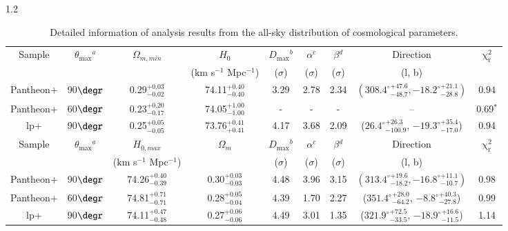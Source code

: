 \documentclass{aa}
\begin{document}
\begin{table}\footnotesize 
        \caption{ Detailed information of analysis results from the all-sky distribution of cosmological parameters. \label{T1}}
        \centering
        \begin{spacing}{1.2}
                \begin{tabular}{ccccccccc} 
                        \hline\hline
                        Sample & $\theta_\mathrm{max}$$^{a}$   & $\Omega_{m,min}$ & $H_{0}$ & $D_\mathrm{max}$$^{b}$ & $\alpha$$^{c}$ & $\beta$$^{d}$ & Direction & $\mathrm{\chi^{2}_{r}}$ \\
                        &   &  & (km s$^{-1}$ Mpc$^{-1}$) & ($\sigma$) & ($\sigma$) & ($\sigma$) & (l, b) & \\
                        \hline
                        Pantheon+ & 90$\degr$  & 0.29$^{+0.03}_{-0.02}$ & 74.11$^{+0.40}_{-0.40}$ &3.29 & 2.78 & 2.34 & $({308.4^{\circ}}_{-48.7}^{+47.6}, {-18.2^{\circ}}_{-28.8}^{+21.1})$ & 0.94 \\
                        Pantheon+ & 60$\degr$  & 0.23$^{+0.20}_{-0.17}$ & 74.05$^{+1.00}_{-1.00}$ & - & - & - & -- & 0.69$^{*}$ \\
                        lp+ & 90$\degr$  & 0.25$^{+0.05}_{-0.05}$ & 73.76$^{+0.41}_{+0.41}$  & 4.17  &  3.68 & 2.09  & (${26.4^{\circ}}_{-100.9}^{+26.3}$, ${-19.3^{\circ}}_{-17.0}^{+35.4}$) & 0.94 \\
                        \hline\hline
                        Sample & $\theta_\mathrm{max}$$^{a}$   & $H_{0,max}$ & $\Omega_{m}$ & $D_\mathrm{max}$$^{b}$&  $\alpha$$^{c}$ & $\beta$$^{d}$ &  Direction & $\mathrm{\chi^{2}_{r}}$ \\
                        &   & (km s$^{-1}$ Mpc$^{-1}$) & & ($\sigma$) &  ($\sigma$)  &  ($\sigma$) &  (l, b) & \\
                        \hline
                        Pantheon+ & 90$\degr$  & 74.26$^{+0.40}_{-0.39}$  & 0.30$^{+0.03}_{-0.03}$ & 4.48 &  3.96 & 3.15  & $({313.4^{\circ}}_{-18.2}^{+19.6}, {-16.8^{\circ}}_{-10.7}^{+11.1})$ & 0.98 \\
                        Pantheon+ & 60$\degr$  & 74.81$^{+0.71}_{-0.71}$  & 0.28$^{+0.05}_{-0.04}$ & 4.39 & 1.70 & 2.27 & (${351.4^{\circ}}_{-64.2}^{+28.0}$, ${-8.8^{\circ}}_{-27.8}^{+40.3}$) & 0.99 \\
                        lp+ & 90$\degr$   & 74.11$^{+0.47}_{-0.48}$ & 0.27$^{+0.06}_{-0.06}$ &  4.49 &  3.01 & 1.35 & (${321.9^{\circ}}_{-33.5}^{+72.5}$, ${-18.9^{\circ}}_{-11.5}^{+16.6}$) & 1.14\\

\end{tabular}
\end{spacing}
\end{table}
\end{document}
